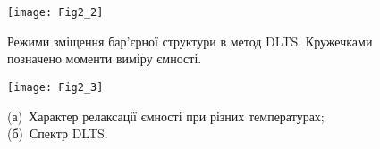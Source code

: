 
\begin{figure}[b]
\center
\vspace{-5mm}
\texttt{[image: Fig2\_2]}
\vspace{-3mm}
\caption{Режими зміщення бар'єрної структури в метод DLTS.
Кружечками позначено моменти виміру ємності.
}
\vspace{-3mm}
\label{F22}
\end{figure}


\begin{figure}[ht]
\center
\vspace{-5mm}
\texttt{[image: Fig2\_3]}
\vspace{-3mm}
\caption{(а)~Характер релаксації ємності при різних температурах;
(б)~Спектр DLTS.
}
\vspace{-3mm}
\label{F23}
\end{figure}




